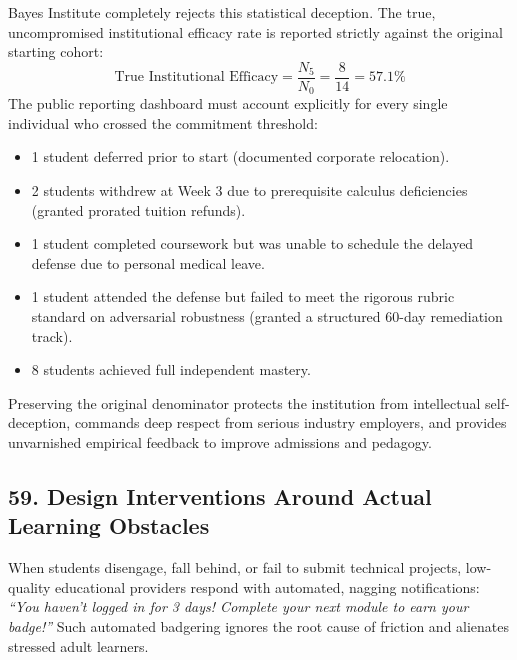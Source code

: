 Bayes Institute completely rejects this statistical deception. The true, uncompromised institutional efficacy rate is reported strictly against the original starting cohort:
\begin{equation}
\text{True Institutional Efficacy} = \frac{N_5}{N_0} = \frac{8}{14} = 57.1\%
\end{equation}
The public reporting dashboard must account explicitly for every single individual who crossed the commitment threshold:
\begin{itemize}[leftmargin=*]
\item 1 student deferred prior to start (documented corporate relocation).
\item 2 students withdrew at Week 3 due to prerequisite calculus deficiencies (granted prorated tuition refunds).
\item 1 student completed coursework but was unable to schedule the delayed defense due to personal medical leave.
\item 1 student attended the defense but failed to meet the rigorous rubric standard on adversarial robustness (granted a structured 60-day remediation track).
\item 8 students achieved full independent mastery.
\end{itemize}

Preserving the original denominator protects the institution from intellectual self-deception, commands deep respect from serious industry employers, and provides unvarnished empirical feedback to improve admissions and pedagogy.

\subsection*{59. Design Interventions Around Actual Learning Obstacles}

When students disengage, fall behind, or fail to submit technical projects, low-quality educational providers respond with automated, nagging notifications: \textit{``You haven't logged in for 3 days! Complete your next module to earn your badge!''} Such automated badgering ignores the root cause of friction and alienates stressed adult learners.

